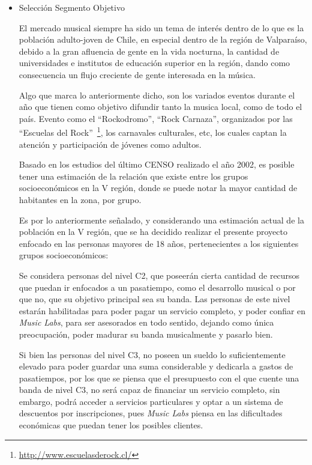 \begin{itemize}
\item{Selección Segmento Objetivo}

El mercado musical siempre ha sido un tema de interés dentro de lo que es la población adulto-joven de Chile,
en especial dentro de la región de Valparaíso, debido a la gran afluencia de gente en la vida nocturna,
la cantidad de universidades e institutos de educación superior en la región,
dando como consecuencia un flujo creciente de gente interesada en la música.

Algo que marca lo anteriormente dicho, son los variados eventos durante el año que tienen como objetivo
difundir tanto la musica local, como de todo el país. Evento como el ``Rockodromo'', ``Rock Carnaza'',
organizados por las ``Escuelas del Rock''~\footnote{\url{http://www.escuelasderock.cl/}},
los carnavales culturales, etc, los cuales captan la atención y participación de jóvenes como
adultos.

Basado en los estudios del último CENSO realizado el año 2002,
es posible tener una estimación de la relación que existe entre los grupos socioeconómicos
en la V región, donde se puede notar la mayor cantidad de habitantes en la zona, por grupo.

Es por lo anteriormente señalado, y considerando una estimación actual de la población
en la V región, que se ha decidido realizar el presente proyecto enfocado en las personas
mayores de 18 años, pertenecientes a los siguientes grupos socioeconómicos:

Se considera personas del nivel C2, que poseerán cierta cantidad de recursos que puedan
ir enfocados a un pasatiempo, como el desarrollo musical o por que no, que su
objetivo principal sea su banda. Las personas de este nivel estarán habilitadas 
para poder pagar un servicio completo,
y poder confiar en \emph{Music Labs}, para ser asesorados en todo sentido,
dejando como única preocupación, poder madurar su banda musicalmente
y pasarlo bien.

Si bien las personas del nivel C3, no poseen un sueldo lo suficientemente elevado
para poder guardar una suma considerable y dedicarla a gastos de pasatiempos,
por los que se piensa que el presupuesto con el que cuente una banda de nivel C3,
no será capaz de financiar un servicio completo, sin embargo, podrá acceder
a servicios particulares y optar a un sistema de descuentos por inscripciones,
pues \emph{Music Labs} piensa en las dificultades económicas que puedan
tener los posibles clientes.


\end{itemize}
